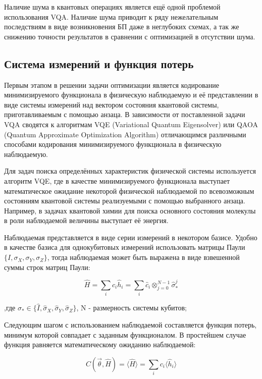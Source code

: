 \documentclass[12pt]{extarticle}
\begin{document}
\qquad Наличие шума в квантовых операциях является ещё одной проблемой использования VQA. Наличие шума приводит к ряду нежелательным последствиям в виде возникновения БП даже в неглубоких схемах, а так же снижению точности результатов в сравнении с оптимизацией в отсутствии шума.


\subsection{Система измерений и функция потерь}

\qquad Первым этапом в решении задачи оптимизации является кодирование минимизируемого функционала в физическую наблюдаемую и её представлении в виде системы измерений над вектором состояния квантовой системы, приготавливаемым с помощью анзаца. В зависимости от поставленной задачи VQA сводятся к алгоритмам VQE (Variational Quantum Eigensolver) или QAOA (Quantum Approximate Optimization Algorithm) отличающимся различными способами кодирования минимизируемого функционала в физическую наблюдаемую.

\qquad Для задач поиска определённых характеристик физической системы используется алгоритм VQE, где в качестве минимизируемого функционала выступает математическое ожидание некоторой физической наблюдаемой по всевозможным состояниям квантовой системы реализуемыми с помощью выбранного анзаца. Например, в задачах квантовой химии для поиска основного состояния молекулы в роли наблюдаемой величины выступает её энергия.

\qquad Наблюдаемая представляется в виде серии измерений в некотором базисе. Удобно в качестве базиса для однокубитовых измерений использовать матрицы Паули $ \{I,\sigma_{X}, \sigma_{Y}, \sigma_{Z}  \}$, тогда наблюдаемая может быть выражена в виде взвешенной суммы строк матриц Паули:

\begin{equation}
\hat H=\sum_{i} c_{i} \hat h_{i} = \sum_{i} \hat c_{i} \otimes^{N-1}_{j = 0} \hat \sigma^{j}_{*} 
\end{equation}

,где $ \sigma_{*} \in \{\hat I,\hat \sigma_{X}, \hat \sigma_{Y}, \hat \sigma_{Z}  \} $, N - размерность системы кубитов;

\qquad Следующим шагом с использованием наблюдаемой составляется функция потерь, минимум которой совпадает с заданным функционалом. В простейшем случае функция равняется математическому ожиданию наблюдаемой:

\begin{equation}
 C( \vec \theta, \hat H ) = \langle \hat H \rangle = \sum_{i} c_{i} \langle \hat h_{i} \rangle
\end{equation} 
\end{document}
